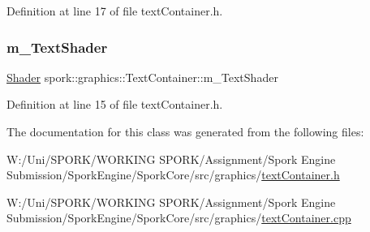 Definition at line 17 of file text\+Container.\+h.

\mbox{\label{classspork_1_1graphics_1_1_text_container_a3a89e588d01b57aefc4cfdc37d2ee7e6}} 
\subsubsection{\texorpdfstring{m\+\_\+\+Text\+Shader}{m\_TextShader}}
{\footnotesize\ttfamily \hyperlink{classspork_1_1graphics_1_1_shader}{Shader} spork\+::graphics\+::\+Text\+Container\+::m\+\_\+\+Text\+Shader}



Definition at line 15 of file text\+Container.\+h.



The documentation for this class was generated from the following files\+:\begin{DoxyCompactItemize}
\item 
W\+:/\+Uni/\+S\+P\+O\+R\+K/\+W\+O\+R\+K\+I\+N\+G S\+P\+O\+R\+K/\+Assignment/\+Spork Engine Submission/\+Spork\+Engine/\+Spork\+Core/src/graphics/\hyperlink{text_container_8h}{text\+Container.\+h}\item 
W\+:/\+Uni/\+S\+P\+O\+R\+K/\+W\+O\+R\+K\+I\+N\+G S\+P\+O\+R\+K/\+Assignment/\+Spork Engine Submission/\+Spork\+Engine/\+Spork\+Core/src/graphics/\hyperlink{text_container_8cpp}{text\+Container.\+cpp}\end{DoxyCompactItemize}
